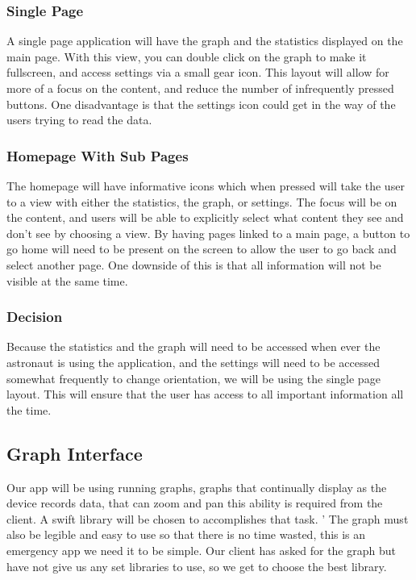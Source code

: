 \documentclass[onecolumn, draftclsnofoot,10pt, compsoc]{IEEEtran}
\begin{document}
\subsubsection{Single Page}
A single page application will have the graph and the statistics displayed on the main page.
With this view, you can double click on the graph to make it fullscreen, and access settings via a small gear icon.
This layout will allow for more of a focus on the content, and reduce the number of infrequently pressed buttons.
One disadvantage is that the settings icon could get in the way of the users trying to read the data.

\subsubsection{Homepage With Sub Pages}
The homepage will have informative icons which when pressed will take the user to a view with either the statistics, the graph, or settings.
The focus will be on the content, and users will be able to explicitly select what content they see and don't see by choosing a view.
By having pages linked to a main page, a button to go home will need to be present on the screen to allow the user to go back and select another page.
One downside of this is that all information will not be visible at the same time.

\subsubsection{Decision}
Because the statistics and the graph will need to be accessed when ever the astronaut is using the application, and the settings will need to be accessed somewhat frequently to change orientation, we will be using the single page layout.
This will ensure that the user has access to all important information all the time.


\subsection{Graph Interface}
Our app will be using running graphs, graphs that continually display as the device records data, that can zoom and pan this ability is required from the client.
 A swift library will be chosen to accomplishes that task. '
The graph must also be legible and easy to use so that there is no time wasted, this is an emergency app we need it to be simple.
Our client has asked for the graph but have not give us any set libraries to use, so we get to choose the best library.
\end{document}
